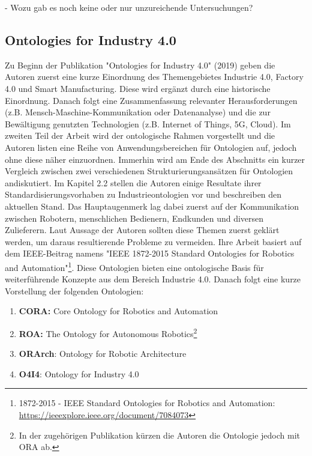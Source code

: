 \documentclass{article}
\begin{document}
- Wozu gab es noch keine oder nur unzureichende Untersuchungen?

\subsection{Ontologies for Industry 4.0}
%

Zu Beginn der Publikation "Ontologies for Industry 4.0" \cite{kumar2019ontologies} (2019) geben die Autoren zuerst eine kurze Einordnung des Themengebietes Industrie 4.0, Factory 4.0 und Smart Manufacturing.
Diese wird ergänzt durch eine historische Einordnung.
Danach folgt eine Zusammenfassung relevanter Herausforderungen (z.B. Mensch-Maschine-Kommunikation oder Datenanalyse) und die zur Bewältigung genutzten Technologien (z.B. Internet of Things, 5G, Cloud).
Im zweiten Teil der Arbeit wird der ontologische Rahmen vorgestellt und die Autoren listen eine Reihe von Anwendungsbereichen für Ontologien auf, jedoch ohne diese näher einzuordnen.
Immerhin wird am Ende des Abschnitts ein kurzer Vergleich zwischen zwei verschiedenen Strukturierungsansätzen für Ontologien andiskutiert.
Im Kapitel 2.2 stellen die Autoren einige Resultate ihrer Standardisierungsvorhaben zu Industrieontologien vor und beschreiben den aktuellen Stand.
Das Hauptaugenmerk lag dabei zuerst auf der Kommunikation zwischen Robotern, menschlichen Bedienern, Endkunden und diversen Zulieferern.
Laut Aussage der Autoren sollten diese Themen zuerst geklärt werden, um daraus resultierende Probleme zu vermeiden.
Ihre Arbeit basiert auf dem IEEE-Beitrag namens "IEEE 1872-2015 Standard Ontologies for Robotics and Automation"\footnote{1872-2015 - IEEE Standard Ontologies for Robotics and Automation: \url{https://ieeexplore.ieee.org/document/7084073}}.
Diese Ontologien bieten eine ontologische Basis für weiterführende Konzepte aus dem Bereich Industrie 4.0.
Danach folgt eine kurze Vorstellung der folgenden Ontologien:
\begin{enumerate}
    \item \textbf{CORA:} Core Ontology for Robotics and Automation
    \item \textbf{ROA:} The Ontology for Autonomous Robotics\footnote{In der zugehörigen Publikation\cite{olszewska2017ontology} kürzen die Autoren die Ontologie jedoch mit ORA ab.}
    \item \textbf{ORArch}: Ontology for Robotic Architecture
    \item \textbf{O4I4}: Ontology for Industry 4.0
\end{enumerate}
\end{document}
